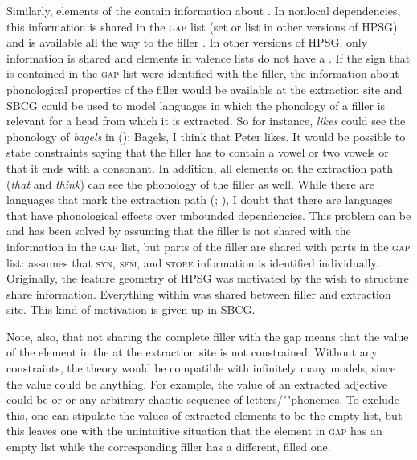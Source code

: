 \documentclass[output=paper,biblatex,babelshorthands,newtxmath,draftmode,colorlinks,citecolor=brown]{langscibook}
\begin{document}
Similarly, elements of the \argstl contain information about \form. In nonlocal dependencies, this
information is shared in the \textsc{gap} list (\slasch set or list in other versions of
HPSG) and is available all the way to the filler \citep[Section~10]{Sag2012a}. In other versions of HPSG, only \local information is shared and elements in valence lists
do not have a \phonf. If the sign that is contained in the \textsc{gap} list were identified with
the filler, the information about phonological properties of the filler would be available at the
extraction site and SBCG could be used to model languages in which the phonology of
a filler is relevant for a head from which it is extracted. So for instance, \emph{likes} could see the
phonology of \emph{bagels} in ():
\ea
Bagels, I think that Peter likes.
\z
It would be possible to state constraints saying that the filler has to contain a vowel or two
vowels or that it ends with a consonant. In addition, all elements on the extraction path
(\emph{that} and \emph{think}) can see the phonology of the filler as well. While there are
languages that mark the extraction path (\citealt[--5]{BMS2001a}; \crossrefchapteralt[\pageref{page-start-extraction-path-effects}--\pageref{page-end-extraction-path-effects}]{udc}), I doubt that there are languages that have phonological
effects over unbounded dependencies. This problem can be and has been solved by assuming that the
filler is not shared with the information in the \textsc{gap} list, but parts of the filler are
shared with parts in the \textsc{gap} list: \citet[]{Sag2012a} assumes that \textsc{syn},
\textsc{sem}, and \textsc{store} information is identified individually. Originally, the feature
geometry of HPSG was motivated by the wish to structure share information. Everything within \local
was shared between filler and extraction site. This kind of motivation is given up in SBCG.

Note, also, that not sharing the complete filler with the gap means that the \form
value of the element in the \argstl at the extraction site is not constrained. Without any
constraints, the theory would be compatible with infinitely many models, since the \form value could be
anything. For example, the \form value of an extracted adjective could be 
or  or any arbitrary chaotic sequence of letters/""phonemes. To exclude this, one can stipulate the \form values of extracted
elements to be the empty list, but this leaves one with the unintuitive situation that the element
in \textsc{gap} has an empty \form list while the corresponding filler has a different, filled one.
\end{document}
